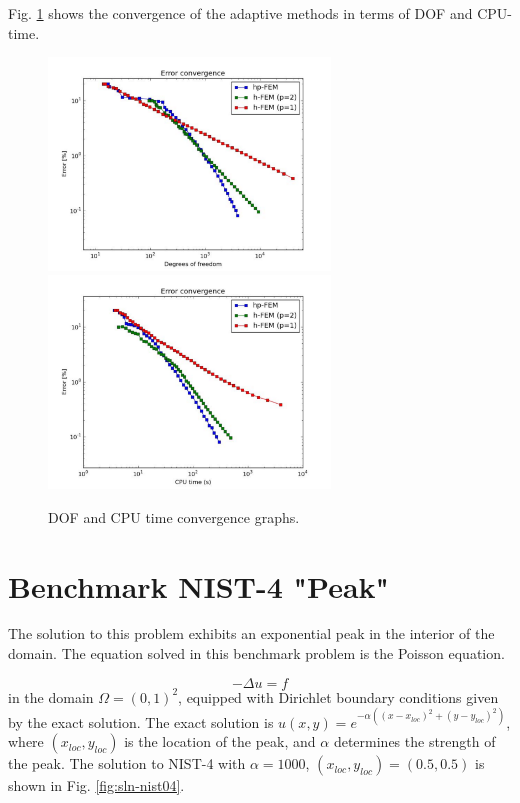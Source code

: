 \documentclass[12pt]{elsarticle}
\begin{document}
Fig. \ref{fig:nist-3-conv} shows the convergence of the adaptive methods in terms of DOF and CPU-time.

\begin{figure}[H]
\centering
\hspace{-50mm}
\includegraphics[width=7.5cm]{mafig21.pdf}\ \
\hspace{-10mm}
\includegraphics[width=7.5cm]{mafig22.pdf}
\hspace{-50mm}
\vspace{-2mm}
\caption{DOF and CPU time convergence graphs.}
\label{fig:nist-3-conv}
\end{figure}


\section{Benchmark NIST-4 "Peak"}
\label{sec:bench-4}

The solution to this problem exhibits an exponential peak in the interior of the domain.
The equation solved in this benchmark problem is the Poisson equation.

\begin{equation} \label{poisson-peak}
-\Delta u = f
\end{equation}
in the domain $\Omega = (0, 1)^2$, equipped with Dirichlet
boundary conditions given by the exact solution.
The exact solution is
$u(x,y) = e^{-\alpha ((x - x_{loc})^{2} + (y - y_{loc})^{2})}$,
where $(x_{loc}, y_{loc})$ is the location of the peak,
and $\alpha$ determines the strength of the peak.
The solution to NIST-4 with $\alpha = 1000$,
$(x_{loc}, y_{loc}) = (0.5, 0.5)$ is shown in Fig. \ref{fig:sln-nist04}.
\end{document}
